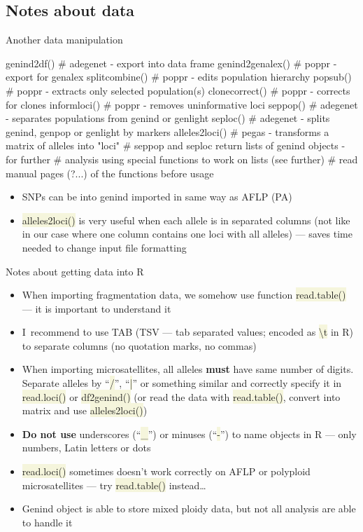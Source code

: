 \documentclass[compress, ucs, xelatex, 11pt, xcolor=svgnames, aspectratio=169,
	hyperref={
		bookmarks=true,
		unicode=true,
		colorlinks=true,
		pdftitle={Molecular data in R},
		plainpages=false,
		pdfauthor={Vojtech Zeisek},
		pdfsubject={Course about phylogeny and evolution in R},
		pdfcreator={XeLaTeX},
		pdfkeywords={R, evolution, phylogeny, molecular data},
		linkcolor=Crimson, %
		anchorcolor=Magenta, %
		citecolor=Magenta, %
		filecolor=Magenta, %
		menucolor=Magenta, %
		urlcolor=DodgerBlue, %
		pdftex},
	url={hyphens, lowtilde} %
	]{beamer}
\renewcommand{\texttt}[1]{\colorbox{Beige}{{\ttfamily #1}}}
\begin{document}
\subsection{Notes about data}

\begin{frame}[fragile]{Another data manipulation}
	\begin{spluscode}
    genind2df() # adegenet - export into data frame
    genind2genalex() # poppr - export for genalex
    splitcombine() # poppr - edits population hierarchy
    popsub() # poppr - extracts only selected population(s)
    clonecorrect() # poppr - corrects for clones
    informloci() # poppr - removes uninformative loci
    seppop() # adegenet - separates populations from genind or genlight
    seploc() # adegenet - splits genind, genpop or genlight by markers
    alleles2loci() # pegas - transforms a matrix of alleles into "loci"
    # seppop and seploc return lists of genind objects - for further
    # analysis using special functions to work on lists (see further)
    # read manual pages (?...) of the functions before usage
	\end{spluscode}
	\begin{itemize}
		\item SNPs can be into genind imported in same way as AFLP (PA)
		\item \texttt{alleles2loci()} is very useful when each allele is in separated columns (not like in our case where one column contains one loci with all alleles) --- saves time needed to change input file formatting
	\end{itemize}
\end{frame}

\begin{frame}{Notes about getting data into R}
	\begin{itemize}
		\item When importing fragmentation data, we somehow use function \texttt{read.table()} --- it is important to understand it
		\item I~recommend to use TAB (TSV --- tab separated values; encoded as \texttt{\textbackslash t} in R) to separate columns (no quotation marks, no commas)
		\item When importing microsatellites, all alleles \textbf{must} have same number of digits. Separate alleles by \enquote{\texttt{/}}, \enquote{\texttt{|}} or something similar and correctly specify it in \texttt{read.loci()} or \texttt{df2genind()} (or read the data with \texttt{read.table()}, convert into matrix and use \texttt{alleles2loci()})
		\item \textbf{Do not use} underscores (\enquote{\texttt{\_}}) or minuses (\enquote{\texttt{-}}) to name objects in R --- only numbers, Latin letters or dots
		\item \texttt{read.loci()} sometimes doesn't work correctly on AFLP or polyploid microsatellites --- try \texttt{read.table()} instead\ldots
		\item Genind object is able to store mixed ploidy data, but not all analysis are able to handle it
	\end{itemize}
\end{frame}
\end{document}

